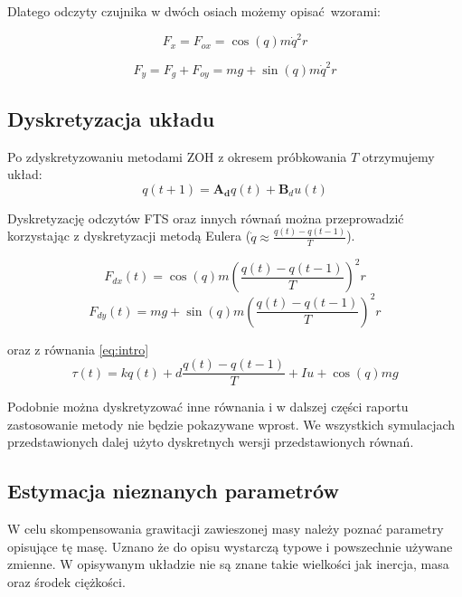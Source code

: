 \documentclass[12pt,a4paper]{article}
\begin{document}
	
	Dlatego odczyty czujnika w dwóch osiach możemy opisać wzorami:
	
	\begin{equation}
	F_x = F_{ox} = \cos{(q)}m\dot{q}^2 r
	\end{equation}
	
	\begin{equation}
	\label{eq:fy}
	F_y = F_g + F_{oy} = mg + \sin{(q)}m\dot{q}^2 r
	\end{equation}
	
	
	\subsection{Dyskretyzacja układu}
	Po zdyskretyzowaniu metodami ZOH z okresem próbkowania $T$ otrzymujemy układ:
	\begin{equation}
	q(t+1) = \mathbf{A_d}q(t) + \mathbf{B}_du(t)
	\label{eq:dyskretny}
	\end{equation}
	
	Dyskretyzację odczytów FTS  oraz innych równań można przeprowadzić korzystając z dyskretyzacji metodą Eulera ($\dot{q} \approx \frac{q(t)-q(t-1)}{T}$).
	
	\begin{equation}
	F_{dx}(t) = \cos{(q)}m(\frac{q(t)-q(t-1)}{T})^2 r
	\end{equation}
	\begin{equation}
	F_{dy}(t) = mg + \sin{(q)}m(\frac{q(t)-q(t-1)}{T})^2 r
	\end{equation}
	
	oraz z równania \ref{eq:intro}
	\begin{equation}
	\tau(t) = kq(t) + d\frac{q(t)-q(t-1)}{T} + Iu + \cos(q)mg
	\end{equation}
	
	Podobnie można dyskretyzować inne równania i w dalszej części raportu zastosowanie metody nie będzie pokazywane wprost. We wszystkich symulacjach przedstawionych dalej użyto dyskretnych wersji przedstawionych równań.
	
	\subsection{Estymacja nieznanych parametrów}
	W celu skompensowania grawitacji zawieszonej masy należy poznać parametry opisujące tę masę. Uznano że do opisu wystarczą typowe i powszechnie używane zmienne. W opisywanym układzie nie są znane takie wielkości jak inercja, masa oraz środek ciężkości.
	
\end{document}
